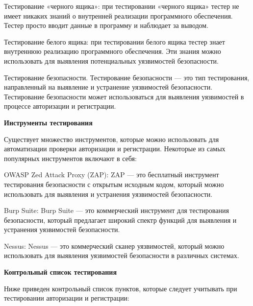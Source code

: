 \begin{compactitem}

    \item    Тестирование «черного ящика»: при тестировании «черного ящика» тестер не имеет никаких знаний о внутренней реализации программного обеспечения. Тестер просто вводит данные в программу и наблюдает за выводом.
    \item    Тестирование белого ящика: при тестировании белого ящика тестер знает внутреннюю реализацию программного обеспечения. Эти знания можно использовать для выявления потенциальных уязвимостей безопасности.
    \item    Тестирование безопасности. Тестирование безопасности — это тип тестирования, направленный на выявление и устранение уязвимостей безопасности. Тестирование безопасности может использоваться для выявления уязвимостей в процессе авторизации и регистрации.
    
\end{compactitem}

\textbf{Инструменты тестирования}

Существует множество инструментов, которые можно использовать для автоматизации проверки авторизации и регистрации. Некоторые из самых популярных инструментов включают в себя:

\begin{compactitem}

    \item    OWASP Zed Attack Proxy (ZAP): ZAP — это бесплатный инструмент тестирования безопасности с открытым исходным кодом, который можно использовать для выявления и устранения уязвимостей безопасности.
    \item    Burp Suite: Burp Suite — это коммерческий инструмент для тестирования безопасности, который предлагает широкий спектр функций для выявления и устранения уязвимостей безопасности.
    \item    Nessus: Nessus — это коммерческий сканер уязвимостей, который можно использовать для выявления уязвимостей безопасности в различных системах.

\end{compactitem}

\textbf{Контрольный список тестирования}

Ниже приведен контрольный список пунктов, которые следует учитывать при тестировании авторизации и регистрации:

